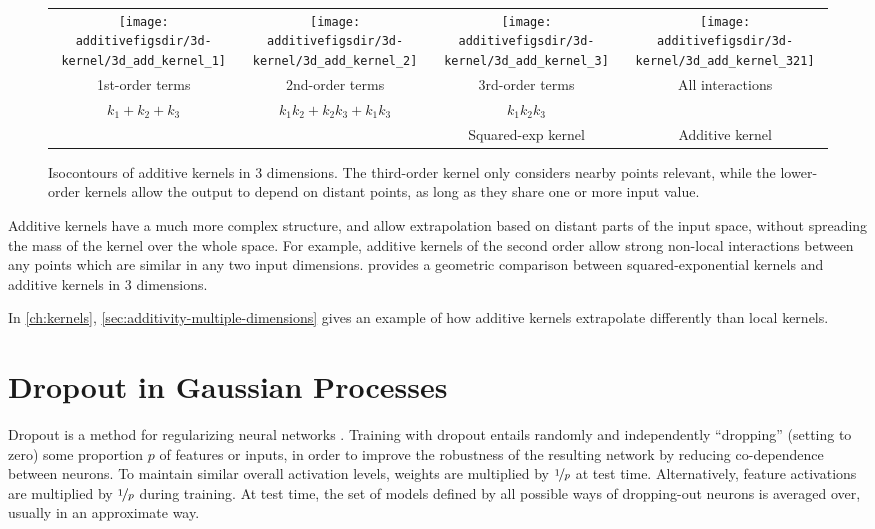 \begin{figure}[ht!]
\centering
\begin{tabular}{cccc}
\hspace{-0.1in}
 \texttt{[image: \\additivefigsdir/3d-kernel/3d\_add\_kernel\_1]} &
\hspace{-0.2in} \texttt{[image: \\additivefigsdir/3d-kernel/3d\_add\_kernel\_2]} &
\hspace{-0.2in} \texttt{[image: \\additivefigsdir/3d-kernel/3d\_add\_kernel\_3]} & 
\hspace{-0.2in} \texttt{[image: \\additivefigsdir/3d-kernel/3d\_add\_kernel\_321]}\\
1st-order terms &
2nd-order terms & 
3rd-order terms & 
All interactions \\
$k_1 + k_2 + k_3$ & $k_1k_2 + k_2k_3 + k_1k_3$ & $k_1k_2k_3$ & \\
& & Squared-exp kernel & Additive kernel\\
\end{tabular}
\caption[Isocontours of additive kernels in 3 dimensions]
{Isocontours of additive kernels in 3 dimensions.
The third-order kernel only considers nearby points relevant, while the lower-order kernels allow the output to depend on distant points, as long as they share one or more input value.}
\label{fig:kernels3d}
\end{figure}

Additive kernels have a much more complex structure, and allow extrapolation based on distant parts of the input space, without spreading the mass of the kernel over the whole space.  For example, additive kernels of the second order allow strong non-local interactions between any points which are similar in any two input dimensions.
 provides a geometric comparison between squared-exponential kernels and additive kernels in 3 dimensions.

In \cref{ch:kernels}, \cref{sec:additivity-multiple-dimensions} gives an example of how additive kernels extrapolate differently than local kernels.


\section{Dropout in Gaussian Processes}

Dropout is a method for regularizing neural networks \citep{hinton2012improving, srivastava2013improving}.
Training with dropout entails randomly and independently ``dropping'' (setting to zero) some proportion $p$ of features or inputs, in order to improve the robustness of the resulting network by reducing co-dependence between neurons.
To maintain similar overall activation levels, weights are multiplied by $\nicefrac{1}{p}$ at test time. Alternatively, feature activations are multiplied by $\nicefrac{1}{p}$ during training.
At test time, the set of models defined by all possible ways of dropping-out neurons is averaged over, usually in an approximate way.

